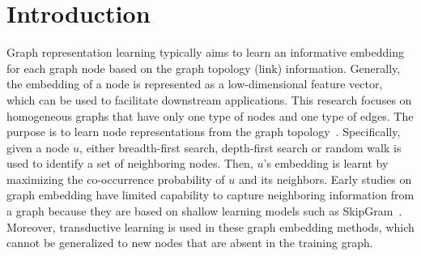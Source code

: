 \documentclass[runningheads]{llncs}
\begin{document}
\section{Introduction}
Graph representation learning typically aims to learn an informative embedding for each graph node based on the graph topology (link) information.
Generally, the embedding of a node is represented as a low-dimensional feature vector, which can be used to facilitate downstream applications.
This research focuses on homogeneous graphs that have only one type of nodes and one type of edges. The purpose is to learn node representations from the graph topology~\cite{grover2016node2vec,perozzi2014deepwalk,dai2016discriminative}.
Specifically, given a node $u$, either breadth-first search, depth-first search or random walk is used to identify a set of neighboring nodes. Then, $u$'s embedding is learnt by maximizing the co-occurrence probability of $u$ and its neighbors.
Early studies on graph embedding have limited capability to capture neighboring information from a graph because they are based on shallow learning models such as SkipGram~\cite{mikolov2013distributed}.
Moreover, transductive learning is used in these graph embedding methods, which cannot be generalized to new nodes that are absent in the training graph.
\end{document}
